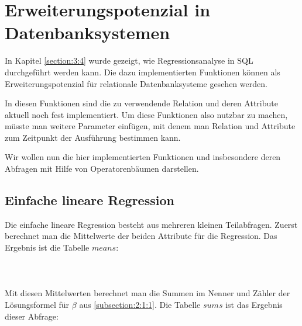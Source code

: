 \chapter{Erweiterungspotenzial in Datenbanksystemen}

In Kapitel \ref{section:3:4} wurde gezeigt, wie Regressionsanalyse in SQL durchgeführt werden kann. Die dazu implementierten Funktionen können als Erweiterungspotenzial für relationale Datenbanksysteme gesehen werden.

In diesen Funktionen sind die zu verwendende Relation und deren Attribute aktuell noch fest implementiert. Um diese Funktionen also nutzbar zu machen, müsste man weitere Parameter einfügen, mit denem man Relation und Attribute zum Zeitpunkt der Ausführung bestimmen kann.

Wir wollen nun die hier implementierten Funktionen und insbesondere deren Abfragen mit Hilfe von Operatorenbäumen darstellen.

\section{Einfache lineare Regression}
\label{section:5:1}

Die einfache lineare Regression besteht aus mehreren kleinen Teilabfragen. Zuerst berechnet man die Mittelwerte der beiden Attribute für die Regression. Das Ergebnis ist die Tabelle $means$:
\\\\
\noindent{}
\\\\
Mit diesen Mittelwerten berechnet man die Summen im Nenner und Zähler der Lösungsformel für $\beta$ aus \ref{subsection:2:1:1}. Die Tabelle $sums$ ist das Ergebnis dieser Abfrage:
\\\\
\noindent{}
\\\\

